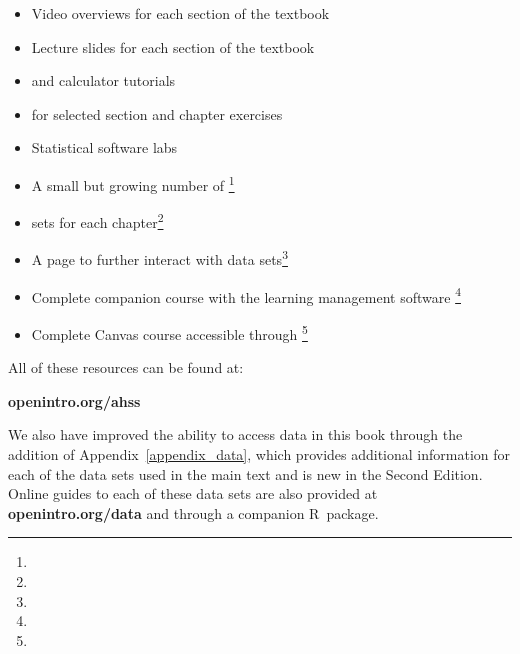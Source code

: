 \begin{itemize}
\setlength{\itemsep}{0mm}
\item Video overviews for each section of the textbook
\item Lecture slides for each section of the textbook
\item {} and  calculator tutorials
\item {} for selected section and chapter exercises
\item Statistical software labs
\item A small but growing number of \footnote{}
\item {} sets for each chapter\footnote{}
\item A  page to further interact with data sets\footnote{}
\item Complete companion course with the learning management software \footnote{}
\item Complete Canvas course accessible through \footnote{}
\end{itemize}

\noindent%
All of these resources can be found at: 
\begin{center}
    {\color{black}\textbf{openintro.org/ahss}}
\end{center}

\noindent%
We also have improved the ability to access data in this book
through the addition of Appendix~\ref{appendix_data},
which provides additional information for each of the data sets
used in the main text and is new in the Second Edition.
Online guides to each of these data sets are also provided at
    {\color{black}\textbf{openintro.org/data}}
and through a
    {companion R~package}.

